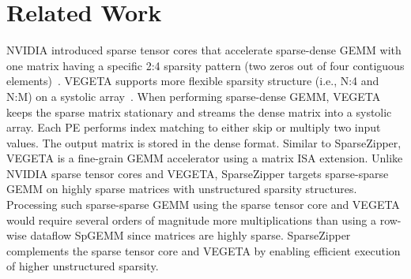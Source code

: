 
\section{Related Work}
\label{sec-spz-related-work}

NVIDIA introduced sparse tensor cores that accelerate sparse-dense GEMM with
one matrix having a specific 2:4 sparsity pattern (two zeros out of four
contiguous
elements)~\cite{pool-nvidia-sparse-tensor-2021,choquette-nvidia-tensor-core-2021}.
VEGETA supports more flexible sparsity structure (i.e., N:4 and N:M) on a
systolic array~\cite{jeong-vegeta-hpca2023}.
When performing sparse-dense GEMM, VEGETA keeps the sparse matrix stationary
and streams the dense matrix into a systolic array.
Each PE performs index matching to either skip or multiply two input values.
The output matrix is stored in the dense format.
Similar to SparseZipper, VEGETA is a fine-grain GEMM accelerator using a matrix
ISA extension.
Unlike NVIDIA sparse tensor cores and VEGETA, SparseZipper targets sparse-sparse
GEMM on highly sparse matrices with unstructured sparsity structures.
Processing such sparse-sparse GEMM using the sparse tensor core and VEGETA
would require several orders of magnitude more multiplications than using a
row-wise dataflow SpGEMM since matrices are highly sparse.
SparseZipper complements the sparse tensor core and VEGETA by enabling efficient execution of higher unstructured sparsity.


